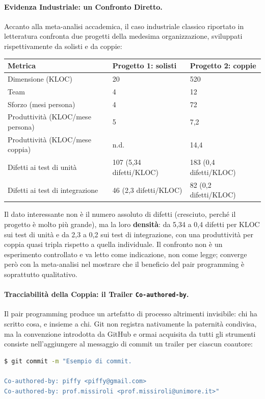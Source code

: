 \documentclass[12pt]{extarticle}
\begin{document}
\paragraph{Evidenza Industriale: un Confronto Diretto.}
Accanto alla meta-analisi accademica, il caso industriale classico riportato in letteratura confronta due progetti della medesima organizzazione, sviluppati rispettivamente da solisti e da coppie:
\begin{center}
\small
\begin{tabular}{p{4.6cm}p{5.0cm}p{5.0cm}}
    \toprule
    \textbf{Metrica} & \textbf{Progetto 1: solisti} & \textbf{Progetto 2: coppie} \\
    \midrule
    Dimensione (KLOC) & 20 & 520 \\
    \addlinespace
    Team & 4 & 12 \\
    \addlinespace
    Sforzo (mesi persona) & 4 & 72 \\
    \addlinespace
    Produttività (KLOC/mese persona) & 5 & 7,2 \\
    \addlinespace
    Produttività (KLOC/mese coppia) & n.d. & 14,4 \\
    \addlinespace
    Difetti ai test di unità & 107 (5,34 difetti/KLOC) & 183 (0,4 difetti/KLOC) \\
    \addlinespace
    Difetti ai test di integrazione & 46 (2,3 difetti/KLOC) & 82 (0,2 difetti/KLOC) \\
    \bottomrule
\end{tabular}
\end{center}

\noindent Il dato interessante non è il numero assoluto di difetti (cresciuto, perché il progetto è molto più grande), ma la loro \textbf{densità}: da 5,34 a 0,4 difetti per KLOC sui test di unità e da 2,3 a 0,2 sui test di integrazione, con una produttività per coppia quasi tripla rispetto a quella individuale. Il confronto non è un esperimento controllato e va letto come indicazione, non come legge; converge però con la meta-analisi nel mostrare che il beneficio del pair programming è soprattutto qualitativo.

\paragraph{Tracciabilità della Coppia: il Trailer \texttt{Co-authored-by}.}
Il pair programming produce un artefatto di processo altrimenti invisibile: chi ha scritto cosa, e insieme a chi. Git non registra nativamente la paternità condivisa, ma la convenzione introdotta da GitHub e ormai acquisita da tutti gli strumenti consiste nell'aggiungere al messaggio di commit un trailer per ciascun coautore:
\begin{lstlisting}[language=bash]
$ git commit -m "Esempio di commit.

Co-authored-by: piffy <piffy@gmail.com>
Co-authored-by: prof.missiroli <prof.missiroli@unimore.it>"
\end{lstlisting}
\end{document}
